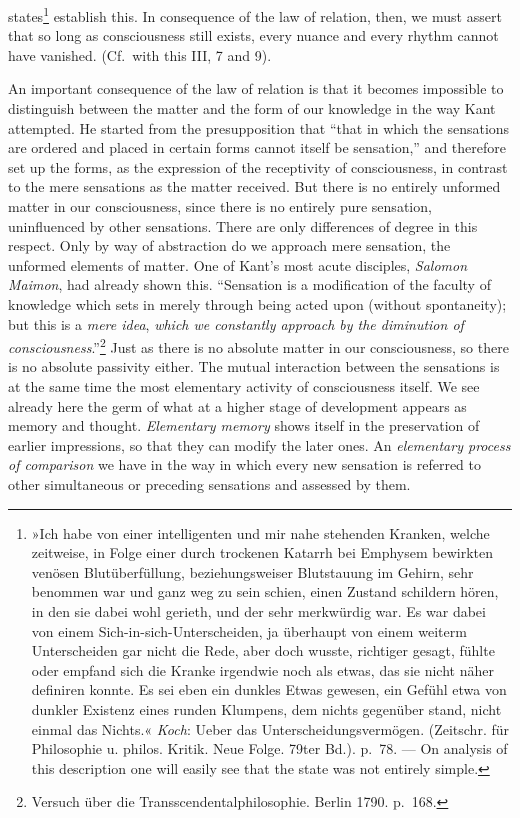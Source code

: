 \documentclass[12pt,a4paper]{book}
\newcommand{\opage}[1]{\marginnote{\footnotesize\textit{[#1]}}}
\begin{document}
states\footnote{»Ich habe von einer intelligenten und mir nahe
stehenden Kranken, welche zeitweise, in Folge einer durch trockenen
Katarrh bei Emphysem bewirkten venösen Blutüberfüllung, beziehungsweiser
Blutstauung im Gehirn, sehr benommen war und ganz weg zu sein schien,
einen Zustand schildern hören, in den sie dabei wohl gerieth, und der
sehr merkwürdig war. Es war dabei von einem Sich-in-sich-Unterscheiden,
ja überhaupt von einem weiterm Unterscheiden gar nicht die Rede, aber
doch wusste, richtiger gesagt, fühlte oder empfand sich die Kranke
irgendwie noch als etwas, das sie nicht näher definiren konnte. Es sei
eben ein dunkles Etwas gewesen, ein Gefühl etwa von dunkler Existenz
eines runden Klumpens, dem nichts gegenüber stand, nicht einmal das
Nichts.« \emph{Koch}: Ueber das Unterscheidungsvermögen. (Zeitschr. für
Philosophie u. philos. Kritik. Neue Folge. 79ter Bd.). p.~78. --- On
analysis of this description one will easily see that the state was not
entirely simple.} establish this.
In consequence of the law of relation, then,
we must assert that so long as consciousness still exists, every nuance
and every rhythm cannot have vanished. (Cf.\ with this III, 7 and 9).

An important consequence of the law of relation is that it becomes
impossible to distinguish between the matter and the form of our
knowledge in the way Kant attempted. He started from the presupposition
that ``that in which the sensations are ordered and placed in certain
forms cannot itself be sensation,'' and therefore set up the forms, as
the expression of the receptivity of consciousness, in contrast to the
mere sensations as the matter received. But there is no entirely
unformed matter in our consciousness, since there is no
\opage{144}entirely pure sensation, uninfluenced by other sensations.
There are only differences of degree in this respect. Only by way of
abstraction do we approach mere sensation, the unformed elements of
matter. One of Kant's most acute disciples, \emph{Salomon Maimon}, had
already shown this. ``Sensation is a modification of the faculty of
knowledge which sets in merely through being acted upon (without
spontaneity); but this is a \emph{mere idea}, \emph{which we constantly
approach by the diminution of consciousness}.''\footnote{Versuch über
die Transscendentalphilosophie. Berlin 1790. p.~168.} Just as there is no
absolute matter in our consciousness, so there is no absolute passivity
either. The mutual interaction between the sensations is at the same
time the most elementary activity of consciousness itself. We see
already here the germ of what at a higher stage of development appears
as memory and thought. \emph{Elementary memory} shows itself in the
preservation of earlier impressions, so that they can modify the later
ones. An \emph{elementary process of comparison} we have in the way in
which every new sensation is referred to other simultaneous or preceding
sensations and assessed by them.
\end{document}
